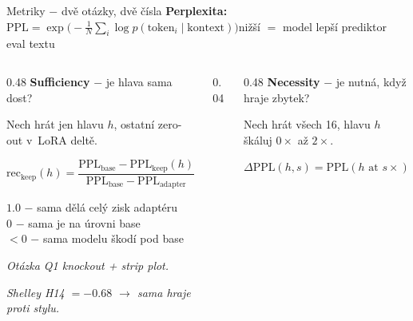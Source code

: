 \documentclass[aspectratio=169,10pt]{beamer}
\begin{document}
\begin{frame}[t]{Metriky $-$ dvě otázky, dvě čísla}
  \vspace{1mm}
  {\footnotesize\color{mutedText}\textbf{Perplexita:}\ \ $\text{PPL} = \exp\!\bigl(-\tfrac{1}{N}\sum_i \log p(\text{token}_i \mid \text{kontext})\bigr)$\quad\textbullet\quad nižší $=$ model lepší prediktor eval textu}\par
  \vspace{3mm}
  \begin{columns}[T,onlytextwidth]
    \begin{column}{0.48\textwidth}
      {\normalsize\textbf{\color{accBlue}Sufficiency} $-$ je hlava sama dost?}\par\vspace{2mm}
      {\footnotesize Nech hrát jen hlavu $h$, ostatní zero-out v~LoRA deltě.}\par\vspace{2mm}
      {\footnotesize $\text{rec}_\text{keep}(h) = \dfrac{\text{PPL}_\text{base} - \text{PPL}_\text{keep}(h)}{\text{PPL}_\text{base} - \text{PPL}_\text{adapter}}$}\par\vspace{3mm}
      {\scriptsize\color{bodyText}$1.0$ $-$ sama dělá celý zisk adaptéru\\
      $0$ $-$ sama je na úrovni base\\
      $< 0$ $-$ sama modelu škodí pod base}\par\vspace{3mm}
      {\footnotesize\color{mutedText}\itshape Otázka Q1 knockout + strip plot.}\par
      {\footnotesize\color{mutedText}\itshape Shelley H14 $= -0.68$ $\to$ sama hraje proti stylu.}
    \end{column}
    \begin{column}{0.04\textwidth}\end{column}
    \begin{column}{0.48\textwidth}
      {\normalsize\textbf{\color{accRed}Necessity} $-$ je nutná, když hraje zbytek?}\par\vspace{2mm}
      {\footnotesize Nech hrát všech 16, hlavu $h$ škáluj $0\times$ až $2\times$.}\par\vspace{2mm}
      {\footnotesize $\Delta\text{PPL}(h, s) = \text{PPL}(h{\scriptscriptstyle\text{ at }}s\times) - \text{PPL}_\text{adapter}$}\par\vspace{3mm}

\end{column}
\end{columns}
\end{frame}
\end{document}
